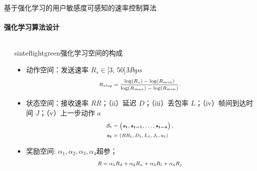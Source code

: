 \documentclass{beamer}
\begin{document}
\begin{frame}[fragile]{基于强化学习的用户敏感度可感知的速率控制算法}
\framesubtitle{强化学习算法设计}


        \begin{columns}
\begin{column}{0.48\textwidth}
\begin{block}
\small  %

\end{block}
\end{column}

\begin{column}{0.5\textwidth}
\begin{colorblock}[black]{sinteflightgreen}{强化学习空间的构成}
\begin{itemize}
    \scriptsize %
    \item 动作空间：发送速率 $R_s \in $[3, 50]$ Mbps$ 
    \begin{equation}
        \scriptsize %
        \begin{aligned}
            R_{slog} = \frac{\log(R_s)-\log(R_{min})}{\log(R_{max})-\log(R_{min})}.
        \end{aligned}
        \label{eq:logsend}
    \end{equation} 
    \item 状态空间：接收速率 $RR$；（ii）延迟 $D$；（iii）丢包率 $L$；（iv）帧间到达时间 $J$；（v）上一步动作 $a$
    \begin{equation}
        \scriptsize
        \begin{aligned}
        \mathcal{S}_t &= \left( \boldsymbol{s_t}, \boldsymbol{s_{t-1}}, \dots, \boldsymbol{s_{t-4}} \right), \\
        \boldsymbol{s_t} &= \left( RR_t, D_t, L_t, J_t, a_t \right)
        \end{aligned}
    \end{equation}
    \item 奖励空间: $\alpha_1, \alpha_2, \alpha_3, \alpha_4$超参；\begin{equation}
    \scriptsize
    \begin{aligned}
    R = \alpha_1 R_d + \alpha_2 R_u + \alpha_3 R_l + \alpha_4 R_j
    \end{aligned}
    \label{eq:total_reward}
    \end{equation}
\end{itemize}
\end{colorblock}

\end{column}

    \end{columns}
\end{frame}
\end{document}
